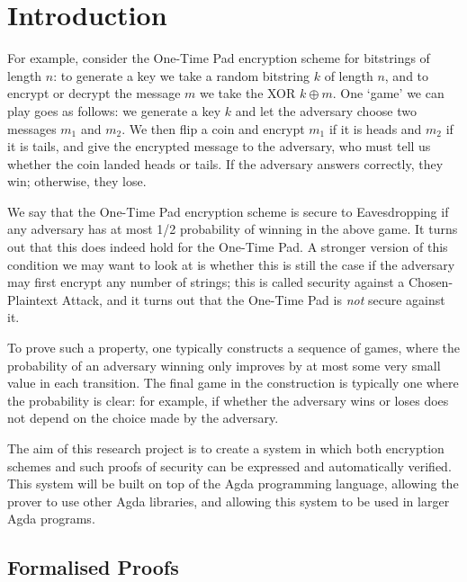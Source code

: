 \chapter{Introduction}




For example, consider the One-Time Pad encryption scheme for bitstrings of length $n$: to generate a key we take a
random bitstring $k$ of length $n$, and to encrypt or decrypt the message $m$ we take the XOR $k \oplus m$.  One
`game' we can play goes as follows: we generate a key $k$ and let the adversary choose two messages $m_1$ and $m_2$.
We then flip a coin and encrypt $m_1$ if it is heads and $m_2$ if it is tails, and give the encrypted message to the
adversary, who must tell us whether the coin landed heads or tails.  If the adversary answers correctly, they win;
otherwise, they lose.

We say that the One-Time Pad encryption scheme is secure to Eavesdropping if any adversary has at most 1/2
probability of winning in the above game.  It turns out that this does indeed hold for the One-Time Pad.  A stronger
version of this condition we may want to look at is whether this is still the case if the adversary may first
encrypt any number of strings; this is called security against a Chosen-Plaintext Attack, and it turns out that the
One-Time Pad is \emph{not} secure against it.

To prove such a property, one typically constructs a sequence of games, where the probability of an adversary
winning only improves by at most some very small value in each transition.  The final game in the construction is
typically one where the probability is clear: for example, if whether the adversary wins or loses does not depend on
the choice made by the adversary.

The aim of this research project is to create a system in which both encryption schemes and such proofs of security
can be expressed and automatically verified.  This system will be built on top of the Agda programming language,
allowing the prover to use other Agda libraries, and allowing this system to be used in larger Agda programs.

\section{Formalised Proofs}

